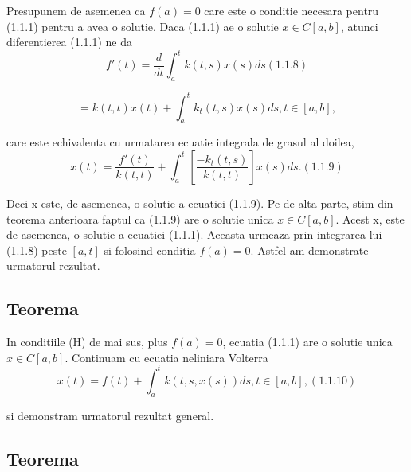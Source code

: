 \documentclass[a4paper,12pt,oneside]{report}
\begin{document}
	Presupunem de asemenea ca \(f\left ( a \right ) = 0\) care este o conditie necesara pentru (1.1.1) pentru a avea o solutie. Daca (1.1.1) ae o solutie \(x\in C\left [ a,b \right ]\), atunci diferentierea (1.1.1) ne da 
\begin{displaymath}
  {f}'\left ( t \right ) = \frac{d}{dt}\int_{a}^{t}k\left ( t,s \right )x\left ( s \right )ds (1.1.8) 
\end{displaymath}
 
\begin{displaymath}
  = k\left ( t,t \right )x\left ( t \right ) + \int_{a}^{t} k_{t}\left ( t,s \right )x\left ( s \right )ds, t\in \left [ a,b \right ],
\end{displaymath}
 
care este echivalenta cu urmatarea ecuatie integrala de grasul al doilea, 
\begin{displaymath}
  x\left ( t \right ) = \frac{{f}'\left ( t \right )}{k\left ( t,t  \right )} + \int_{a}^{t} \left [ \frac{-k_{t}\left ( t,s \right )}{k\left ( t,t \right )} \right ]x\left ( s \right )ds. (1.1.9)
\end{displaymath}

	Deci x este, de asemenea, o solutie a ecuatiei (1.1.9). Pe de alta parte, stim din teorema anterioara faptul ca (1.1.9) are o solutie unica \(x\in C\left [ a,b \right ]\). Acest x, este de asemenea, o solutie a ecuatiei (1.1.1). Aceasta urmeaza prin integrarea lui (1.1.8) peste \(\left [ a,t \right ]\) si folosind conditia \(f\left ( a \right ) = 0\). Astfel am demonstrate urmatorul rezultat. 

\subsection{Teorema}

In conditiile (H) de mai sus, plus \(f\left ( a \right ) = 0\), ecuatia (1.1.1) are o solutie unica \(x \in C\left [ a,b \right ]\).
	Continuam cu ecuatia neliniara Volterra 
\begin{displaymath}
  x\left ( t \right ) = f\left ( t \right ) + \int_{a}^{t}k\left ( t,s,x\left ( s \right ) \right )ds, t\in \left [ a,b \right ], (1.1.10)
\end{displaymath}

si demonstram urmatorul rezultat general. 

\subsection{Teorema}
\end{document}
